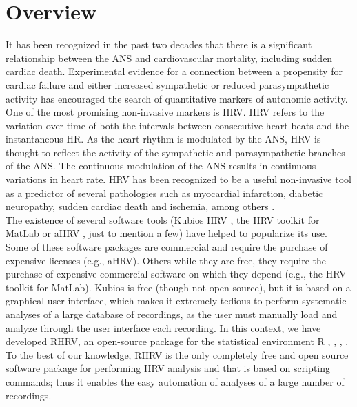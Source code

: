\documentclass[12pt,lot, lof]{puthesis}
\title{\rhrvTitle}
\author{Constantino A. Garc\'{i}a$^*$, Abraham Otero and Xos\'{e} Vila}
\begin{document}
 
\setlength{\parindent}{0pt}
\makefrontmatter

\makeglossaries
\printglossary[type=\acronymtype] 



\chapter{Overview\label{ch:overview}}
It has been recognized in the past two decades that there is a significant 
relationship between the \gls{ANS} and cardiovascular mortality, including 
sudden cardiac death. Experimental evidence for a connection between a 
propensity for cardiac failure and either increased sympathetic or reduced
parasympathetic activity has encouraged the search of quantitative markers of
autonomic activity.\\

One of the most promising non-invasive markers is \gls{HRV}. \gls{HRV} refers
to the variation over time of both the intervals between consecutive heart beats
and the instantaneous \gls{HR}. As the heart rhythm is modulated by the
\gls{ANS}, \gls{HRV} is thought to reflect the activity of the sympathetic and 
parasympathetic branches of the \gls{ANS}. The continuous modulation of the
ANS results in continuous variations in heart rate. \gls{HRV} has been 
recognized
to be a useful non-invasive tool as a predictor of several pathologies such as
myocardial infarction, diabetic neuropathy, sudden cardiac death and ischemia,
among others \cite{kautznerClinical}. \\

The existence of several software tools (Kubios HRV \cite%
{kubios}, the \gls{HRV} toolkit for MatLab \cite{matlab} or aHRV
\cite{ahrv}, just to mention a few) have helped to popularize its use. Some of 
these software packages are commercial and require the purchase of expensive 
licenses (e.g., aHRV). Others while they are free, they require the purchase of 
expensive commercial software on which they depend (e.g., the HRV toolkit for 
MatLab).  Kubios is free (though not open source), but it is based on a 
graphical user interface, which makes it extremely tedious to perform 
systematic analyses of a large database of recordings, as the user must 
manually load and analyze through the user interface each recording.  In this 
context, we have developed RHRV, an open-source package for the statistical 
environment R \cite{waveletBiosignals}, \cite{waveletArticle}, \cite{vilaRHRV}, 
\cite{vila2009r}. To the best of our knowledge, RHRV is the only completely 
free and open source software package for performing HRV analysis and that is 
based on scripting commands; thus it enables the easy automation of analyses of 
a large number of 
recordings. \\
\end{document}
